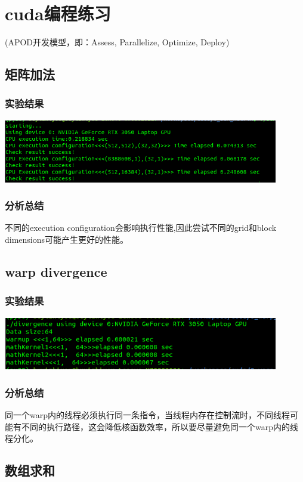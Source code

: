 \section{cuda编程练习}
\noindent
(APOD开发模型，即：Assess, Parallelize, Optimize, Deploy)

\subsection{矩阵加法}
\subsubsection{实验结果}
\noindent
\includegraphics[width=0.9\textwidth]{assets/matrix.png}
\subsubsection{分析总结}
\noindent
不同的execution configuration会影响执行性能,因此尝试不同的grid和block dimensions可能产生更好的性能。

\subsection{warp divergence}
\subsubsection{实验结果}
\noindent
\includegraphics[width=0.9\textwidth]{assets/warp_d.png}
\subsubsection{分析总结}
\noindent
同一个warp内的线程必须执行同一条指令，当线程内存在控制流时，不同线程可能有不同的执行路径，这会降低核函数效率，所以要尽量避免同一个warp内的线程分化。

\subsection{数组求和}
